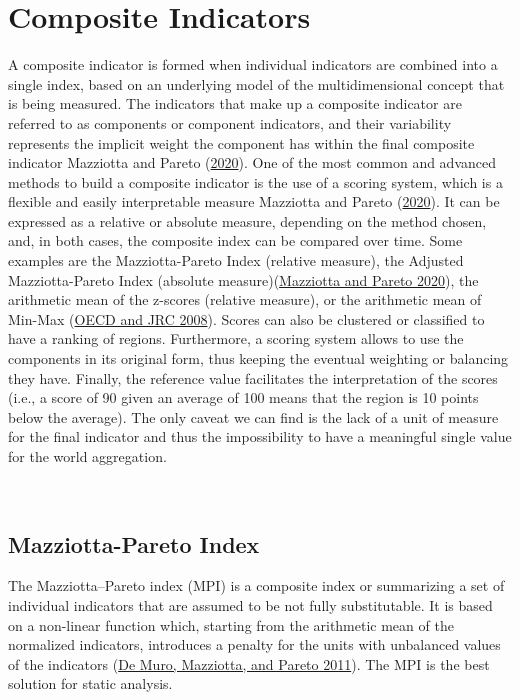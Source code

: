 \documentclass[
]{svmono}
\begin{document}
\hypertarget{composite-indicators}{%
\section{Composite Indicators}\label{composite-indicators}}

A composite indicator is formed when individual indicators are combined
into a single index, based on an underlying model of the
multidimensional concept that is being measured. The indicators that
make up a composite indicator are referred to as components or component
indicators, and their variability represents the implicit weight the
component has within the final composite indicator Mazziotta and Pareto (\protect\hyperlink{ref-mazziotta2020}{2020}). One of the most common and advanced methods to build a
composite indicator is the use of a scoring system, which is a flexible
and easily interpretable measure Mazziotta and Pareto (\protect\hyperlink{ref-mazziotta2020}{2020}).
It can be expressed as a relative or absolute measure, depending on the
method chosen, and, in both cases, the composite index can be compared
over time. Some examples are the Mazziotta-Pareto Index (relative
measure), the Adjusted Mazziotta-Pareto Index (absolute
measure)(\protect\hyperlink{ref-mazziotta2020}{Mazziotta and Pareto 2020}), the arithmetic mean of the z-scores (relative
measure), or the arithmetic mean of Min-Max (\protect\hyperlink{ref-joint2008handbook}{OECD and JRC 2008}). Scores
can also be clustered or classified to have a ranking of regions.
Furthermore, a scoring system allows to use the components in its
original form, thus keeping the eventual weighting or balancing they
have. Finally, the reference value facilitates the interpretation of the
scores (i.e., a score of 90 given an average of 100 means that the
region is 10 points below the average). The only caveat we can find is
the lack of a unit of measure for the final indicator and thus the
impossibility to have a meaningful single value for the world
aggregation.

~

\hypertarget{mazziotta-pareto-index}{%
\subsection{Mazziotta-Pareto Index}\label{mazziotta-pareto-index}}

The Mazziotta--Pareto index (MPI) is a composite index or summarizing a
set of individual indicators that are assumed to be not fully
substitutable. It is based on a non-linear function which, starting from
the arithmetic mean of the normalized indicators, introduces a penalty
for the units with unbalanced values of the indicators
(\protect\hyperlink{ref-de2011composite}{De Muro, Mazziotta, and Pareto 2011}). The MPI is the best solution for static analysis.
\end{document}
